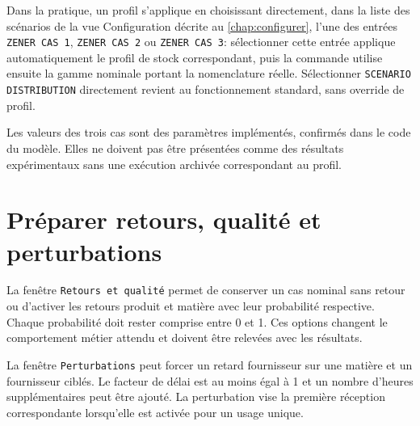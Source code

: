 Dans la pratique, un profil s'applique en choisissant directement, dans la liste des scénarios de la vue Configuration décrite au \cref{chap:configurer}, l'une des entrées \texttt{ZENER CAS 1}, \texttt{ZENER CAS 2} ou \texttt{ZENER CAS 3}: sélectionner cette entrée applique automatiquement le profil de stock correspondant, puis la commande utilise ensuite la gamme nominale portant la nomenclature réelle. Sélectionner \texttt{SCENARIO DISTRIBUTION} directement revient au fonctionnement standard, sans override de profil.


Les valeurs des trois cas sont des paramètres implémentés, confirmés dans le code du modèle. Elles ne doivent pas être présentées comme des résultats expérimentaux sans une exécution archivée correspondant au profil.


\section{Préparer retours, qualité et perturbations}

La fenêtre \texttt{Retours et qualité} permet de conserver un cas nominal sans retour ou d'activer les retours produit et matière avec leur probabilité respective. Chaque probabilité doit rester comprise entre 0 et 1. Ces options changent le comportement métier attendu et doivent être relevées avec les résultats.


La fenêtre \texttt{Perturbations} peut forcer un retard fournisseur sur une matière et un fournisseur ciblés. Le facteur de délai est au moins égal à 1 et un nombre d'heures supplémentaires peut être ajouté. La perturbation vise la première réception correspondante lorsqu'elle est activée pour un usage unique.

